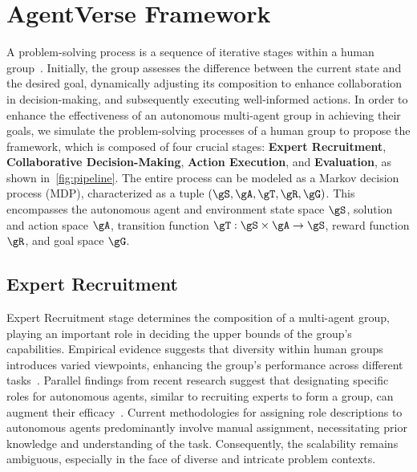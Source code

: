 \section{AgentVerse Framework}
\label{sec:method}



A problem-solving process is a sequence of iterative stages within a human group~\citep{Bransford_Stein_1993}. Initially, the group assesses the difference between the current state and the desired goal, dynamically adjusting its composition to enhance collaboration in decision-making, and subsequently executing well-informed actions. In order to enhance the effectiveness of an autonomous multi-agent group in achieving their goals, we simulate the problem-solving processes of a human group to propose the \framework framework, which is composed of four crucial stages: \textbf{Expert Recruitment}, \textbf{Collaborative Decision-Making}, \textbf{Action Execution}, and \textbf{Evaluation}, as shown in~\cref{fig:pipeline}. 
The entire process can be modeled as a Markov decision process (MDP), characterized as a tuple $(\gS, \gA, \gT, \gR, \gG)$. This encompasses the autonomous agent and environment state space $\gS$, solution and action space $\gA$, transition function $\gT: \gS \times \gA\rightarrow \gS$, reward function $\gR$, and goal space $\gG$.



\subsection{Expert Recruitment}
\label{sec:method-recruitment}

Expert Recruitment stage determines the composition of a multi-agent group, playing an important role in deciding the upper bounds of the group's capabilities. Empirical evidence suggests that diversity within human groups introduces varied viewpoints, enhancing the group's performance across different tasks~\citep{collective_intelligence_and_group_performance,williams1998demography}. Parallel findings from recent research suggest that designating specific roles for autonomous agents, similar to recruiting experts to form a group, can augment their efficacy~\citep{DBLP:journals/corr/abs-2303-17760,DBLP:journals/corr/abs-2305-14930,DBLP:journals/corr/abs-2307-07924}. Current methodologies for assigning role descriptions to autonomous agents predominantly involve manual assignment, necessitating prior knowledge and understanding of the task. Consequently, the scalability remains ambiguous, especially in the face of diverse and intricate problem contexts.

